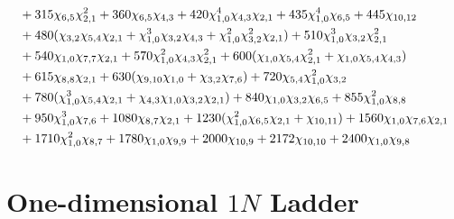 {\begin{align*}
 &+ 315 \chi_{6, 5} \chi_{2, 1}^{2}  + 360 \chi_{6, 5} \chi_{4, 3}  + 420 \chi_{1, 0}^{4} \chi_{4, 3} \chi_{2, 1}  + 435 \chi_{1, 0}^{4} \chi_{6, 5}  + 445 \chi_{10, 12}  \\
 &+ 480 (\chi_{3, 2} \chi_{5, 4} \chi_{2, 1}  + \chi_{1, 0}^{3} \chi_{3, 2} \chi_{4, 3}  + \chi_{1, 0}^{2} \chi_{3, 2}^{2} \chi_{2, 1} ) + 510 \chi_{1, 0}^{3} \chi_{3, 2} \chi_{2, 1}^{2}  \\
 &+ 540 \chi_{1, 0} \chi_{7, 7} \chi_{2, 1}  + 570 \chi_{1, 0}^{2} \chi_{4, 3} \chi_{2, 1}^{2}  + 600 (\chi_{1, 0} \chi_{5, 4} \chi_{2, 1}^{2}  + \chi_{1, 0} \chi_{5, 4} \chi_{4, 3} ) \\
 &+ 615 \chi_{8, 8} \chi_{2, 1}  + 630 (\chi_{9, 10} \chi_{1, 0}  + \chi_{3, 2} \chi_{7, 6} ) + 720 \chi_{5, 4} \chi_{1, 0}^{2} \chi_{3, 2}  \\
 &+ 780 (\chi_{1, 0}^{3} \chi_{5, 4} \chi_{2, 1}  + \chi_{4, 3} \chi_{1, 0} \chi_{3, 2} \chi_{2, 1} ) + 840 \chi_{1, 0} \chi_{3, 2} \chi_{6, 5}  + 855 \chi_{1, 0}^{2} \chi_{8, 8}  \\
 &+ 950 \chi_{1, 0}^{3} \chi_{7, 6}  + 1080 \chi_{8, 7} \chi_{2, 1}  + 1230 (\chi_{1, 0}^{2} \chi_{6, 5} \chi_{2, 1}  + \chi_{10, 11} ) + 1560 \chi_{1, 0} \chi_{7, 6} \chi_{2, 1}  \\
 &+ 1710 \chi_{1, 0}^{2} \chi_{8, 7}  + 1780 \chi_{1, 0} \chi_{9, 9}  + 2000 \chi_{10, 9}  + 2172 \chi_{10, 10}  + 2400 \chi_{1, 0} \chi_{9, 8}
\end{align*}
}

\section{One-dimensional \texorpdfstring{$1N$}{1N} Ladder}
\label{sec:one_d_ladder}
\begin{center}
\TIKZgraphoneline
\end{center}

